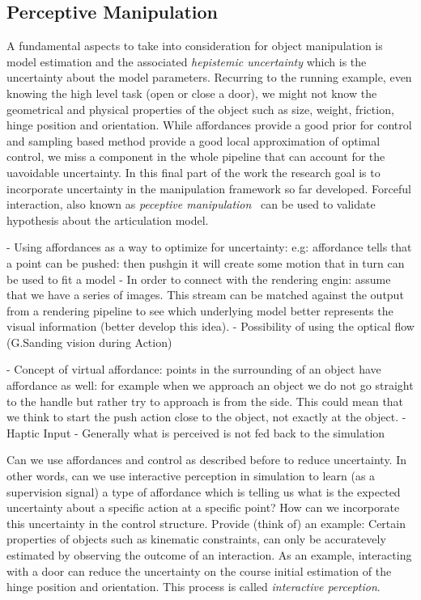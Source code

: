 \subsection{Perceptive Manipulation}
A fundamental aspects to take into consideration for object manipulation is model estimation and the associated \emph{hepistemic uncertainty} which is the uncertainty about the model parameters. Recurring to the running example, even knowing the high level task (open or close a door), we might not know the geometrical and physical properties of the object such as size, weight, friction, hinge position and orientation. While affordances provide a good prior for control and sampling based method provide a good local approximation of optimal control, we miss a component in the whole pipeline that can account for the uavoidable uncertainty. In this final part of the work the research goal is to incorporate uncertainty in the manipulation framework so far developed. Forceful interaction, also known as \emph{peceptive manipulation}~\cite{bohg2017interactive} can be used to validate hypothesis about the articulation model. 

- Using affordances as a way to optimize for uncertainty: e.g: affordance tells that a point can be pushed: then pushgin it will create some motion that in turn can be used to fit a model
- In order to connect with the rendering engin: assume that we have a series of images. This stream can be matched against the output from a rendering pipeline to see which underlying model better represents the visual information (better develop this idea).
- Possibility of using the optical flow (G.Sanding vision during Action)

- Concept of virtual affordance: points in the surrounding of an object have affordance as well: for example when we approach an object we do not go straight to the handle but rather try to approach is from the side. This could mean that we think to start the push action close to the object, not exactly at the object. 	
- Haptic Input
- Generally what is perceived is not fed back to the simulation 

Can we use affordances and control as described before to reduce uncertainty. In other words, can we use interactive perception in simulation to learn (as a supervision signal) a type of affordance which is telling us what is the expected uncertainty about a specific action at a specific point? How can we incorporate this uncertainty in the control structure. Provide (think of) an example: 
Certain properties of objects such as kinematic constraints, can only be accuratevely estimated by observing the outcome of an interaction. As an example, interacting with a door can reduce the uncertainty on the course initial estimation of the hinge position and orientation. This process is called \emph{interactive perception}.  

